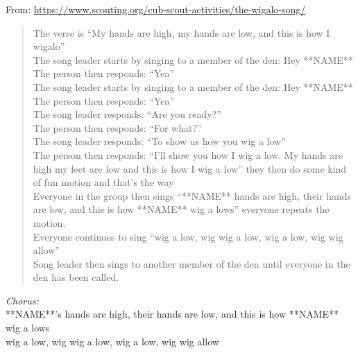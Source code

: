 
From: \url{https://www.scouting.org/cub-scout-activities/the-wigalo-song/}

\begin{verse}
The verse is “My hands are high, my hands are low, and this is how I wigalo” \\
The song leader starts by singing to a member of the den: Hey **NAME** \\
The person then responds: “Yea” \\
The song leader starts by singing to a member of the den: Hey **NAME** \\
The person then responds: “Yea” \\
The song leader responds: “Are you ready?” \\
The person then responds: “For what?” \\
The song leader responds: “To show us how you wig a low” \\
The person then responds: “I’ll show you how I wig a low.  My hands are high my feet are low and this is how I wig a low” they then do some kind of fun motion and that’s the way \\
Everyone in the group then sings “**NAME** hands are high, their hands are low, and this is how **NAME** wig a lows” everyone repeats the motion. \\
Everyone continues to sing “wig a low, wig wig a low, wig a low, wig wig allow”  \\
Song leader then sings to another member of the den until everyone in the den has been called. 
\end{verse}

\begin{center}
\textit{Chorus:} \\
**NAME**'s hands are high, their hands are low, and this is how **NAME** wig a lows \\
wig a low, wig wig a low, wig a low, wig wig allow
\end{center}
